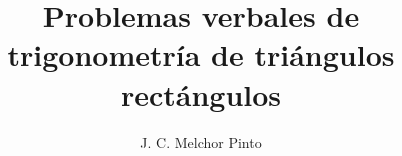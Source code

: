 \documentclass[12pt]{guia}
\title{Problemas verbales de trigonometría de triángulos rectángulos}
\author{J. C. Melchor Pinto}
\begin{document}
\pagestyle{headandfoot}
\addpoints
\INFO
\printanswers
\vspace{-0.9cm}
\begin{multicols}{2}
    \columnbreak
\end{multicols}
%
% 
% 
\begin{questions}
    \questionboxed[10] 
    \questionboxed[10] 
    \questionboxed[10] 
    \questionboxed[10] 
    \questionboxed[10] 
    \questionboxed[10] 
    \questionboxed[10] 
\end{questions}
\end{document}
